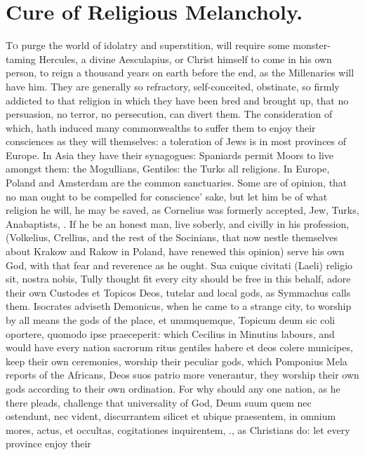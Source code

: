{%
\section{Cure of Religious Melancholy.}

\lettrine{T}{o} purge the world of idolatry and superstition, will require some
monster-taming Hercules, a divine Aesculapius, or Christ himself to
come in his own person, to reign a thousand years on earth before the
end, as the Millenaries will have him. They are generally so
refractory, self-conceited, obstinate, so firmly addicted to that
religion in which they have been bred and brought up, that no
persuasion, no terror, no persecution, can divert them. The
consideration of which, hath induced many commonwealths to suffer them
to enjoy their consciences as they will themselves: a toleration of
Jews is in most provinces of Europe. In Asia they have their
synagogues: Spaniards permit Moors to live amongst them: the
Mogullians, Gentiles: the Turks all religions. In Europe, Poland and
Amsterdam are the common sanctuaries. Some are of opinion, that no man
ought to be compelled for conscience' sake, but let him be of what
religion he will, he may be saved, as Cornelius was formerly accepted,
Jew, Turks, Anabaptists, \etc{}. If he be an honest man, live soberly, and
civilly in his profession, (Volkelius, Crellius, and the rest of the
Socinians, that now nestle themselves about Krakow and Rakow in Poland,
have renewed this opinion) serve his own God, with that fear and
reverence as he ought. Sua cuique civitati (Laeli) religio sit, nostra
nobis, Tully thought fit every city should be free in this behalf,
adore their own Custodes et Topicos Deos, tutelar and local gods, as
Symmachus calls them. Isocrates adviseth Demonicus, when he came to a
strange city, to worship by all means the gods of the place, et
unumquemque, Topicum deum sic coli oportere, quomodo ipse praeceperit:
which Cecilius in Minutius labours, and would have every nation
sacrorum ritus gentiles habere et deos colere municipes, keep their own
ceremonies, worship their peculiar gods, which Pomponius Mela reports
of the Africans, Deos suos patrio more venerantur, they worship their
own gods according to their own ordination. For why should any one
nation, as he there pleads, challenge that universality of God, Deum
suum quem nec ostendunt, nec vident, discurrantem silicet et ubique
praesentem, in omnium mores, actus, et occultas, cogitationes
inquirentem, \etc{}., as Christians do: let every province enjoy their
}

